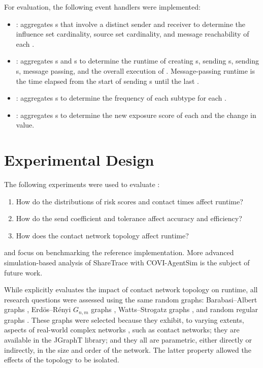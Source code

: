 For evaluation, the following event handlers were implemented:

\begin{itemize}
  \item {}: aggregates s that involve a distinct sender and receiver to determine the influence set cardinality, source set cardinality, and message reachability of each .
  \item {}: aggregates s and s to determine the runtime of creating s, sending s, sending s, message passing, and the overall execution of . Message-passing runtime is the time elapsed from the start of sending s until the last .
  \item {}: aggregates s to determine the frequency of each subtype for each .
  \item {}: aggregates s to determine the new exposure score of each  and the change in value.
\end{itemize}

\section{Experimental Design}

The following experiments were used to evaluate :
\begin{enumerate}[itemsep=-4ex, ref={Experiment \arabic*}]
  \item How do the distributions of risk scores and contact times affect runtime? \label{item:distributions}
  \item How do the send coefficient and tolerance affect accuracy and efficiency? \label{item:parameters}
  \item How does the contact network topology affect runtime? \label{item:topology}
\end{enumerate}
 and  focus on benchmarking the reference implementation. More advanced simulation-based analysis of ShareTrace with COVI-AgentSim \citep{Gupta2020} is the subject of future work.

While  explicitly evaluates the impact of contact network topology on runtime, all research questions were assessed using the same random graphs: Barabasi--Albert graphs \citep{Barabasi1999}, Erd\"{o}s--R\'{e}nyi $G_{n,m}$ graphs \citep{Erdos1959}, Watts--Strogatz graphs \citep{Watts1998}, and random regular graphs \citep{Kim2003}. These graphs were selected because they exhibit, to varying extents, aspects of real-world complex networks \citep{Newman2003}, such as contact networks; they are available in the JGraphT library; and they all are parametric, either directly or indirectly, in the size and order of the network. The latter property allowed the effects of the topology to be isolated.


